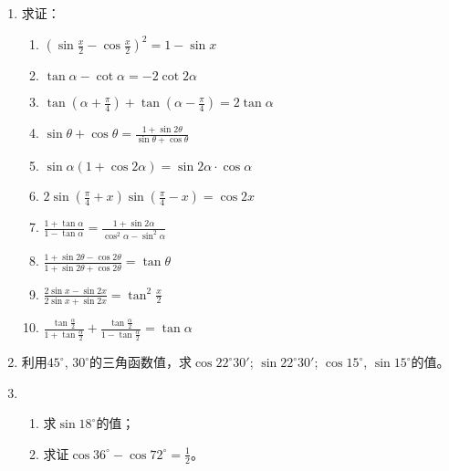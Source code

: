 \begin{enumerate}
\item 求证：
\begin{enumerate}
    \item $\left(\sin\frac{x}{2}-\cos\frac{x}{2}\right)^2=1-\sin x$
    \item $\tan\alpha-\cot\alpha=-2\cot 2\alpha$
    \item $\tan\left(\alpha+\frac{\pi}{4}\right)+\tan\left(\alpha-\frac{\pi}{4}\right)=2\tan\alpha$
    \item $\sin\theta+\cos\theta=\frac{1+\sin2\theta}{\sin\theta+\cos\theta}$
    \item $\sin\alpha(1+\cos2\alpha)=\sin2\alpha\cdot \cos\alpha$
    \item $2\sin\left(\frac{\pi}{4}+x\right)\sin\left(\frac{\pi}{4}-x\right)=\cos2x$
    \item $\frac{1+\tan\alpha}{1-\tan\alpha}=\frac{1+\sin2\alpha}{\cos^2\alpha-\sin^2\alpha}$
    \item $\frac{1+\sin2\theta-\cos2\theta}{1+\sin2\theta+\cos2\theta}=\tan\theta$
    \item $\frac{2\sin x-\sin2x}{2\sin x+\sin2x}=\tan^2\frac{x}{2}$
    \item $\frac{\tan\frac{\alpha}{2}}{1+\tan\frac{\alpha}{2}}+\frac{\tan\frac{\alpha}{2}}{1-\tan\frac{\alpha}{2}}=\tan\alpha$
\end{enumerate}

\item 利用$45^{\circ}$, $30^{\circ}$的三角函数值，求$\cos22^{\circ}30'$; $\sin22^{\circ}30'$; $\cos15^{\circ}$, $\sin15^{\circ}$的值。
\item \begin{enumerate}
    \item 求$\sin18^{\circ}$的值；
    \item 求证$\cos36^{\circ}-\cos72^{\circ}=\frac{1}{2}$。
\end{enumerate}


\end{enumerate}
